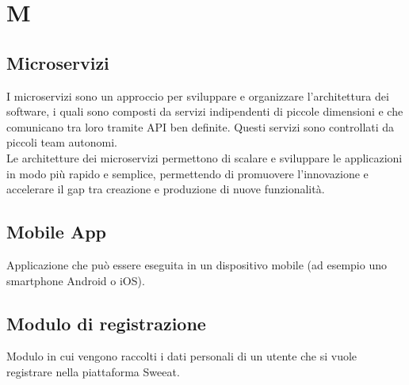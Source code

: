 \section{M}

\subsection{Microservizi} I microservizi sono un approccio per sviluppare e organizzare l’architettura dei software, i quali sono composti da servizi indipendenti di piccole dimensioni e che comunicano tra loro tramite API ben definite. Questi servizi sono controllati da piccoli team autonomi. \\
Le architetture dei microservizi permettono di scalare e sviluppare le applicazioni in modo più rapido e semplice, permettendo di promuovere l’innovazione e accelerare il gap tra creazione e produzione di nuove funzionalità.

\subsection{Mobile App} Applicazione che può essere eseguita in un dispositivo mobile (ad esempio uno smartphone Android o iOS).

\subsection{Modulo di registrazione} Modulo in cui vengono raccolti i dati personali di un utente che si vuole registrare nella piattaforma Sweeat.

\clearpage